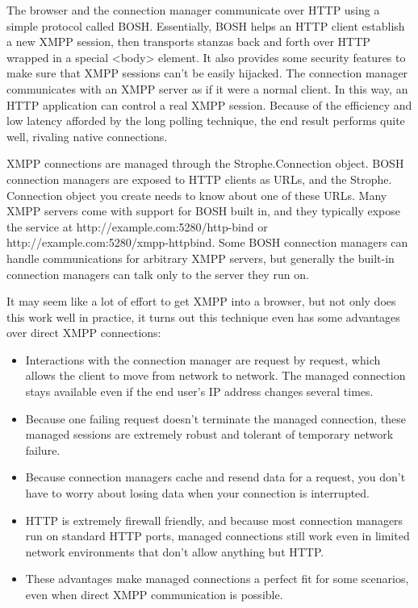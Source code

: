 	The browser and the connection manager communicate over HTTP using a simple protocol called BOSH. Essentially, BOSH helps an HTTP client establish a new XMPP session, then transports stanzas back and forth over HTTP wrapped in a special <body> element. It also provides some security features to make sure that XMPP sessions can’t be easily hijacked. The connection manager communicates with an XMPP server as if it were a normal client. In this way, an HTTP application can control a real XMPP session. Because of the efficiency and low latency afforded by the long polling technique, the end result performs quite well, rivaling native connections.

	XMPP connections are managed through the Strophe.Connection object. BOSH connection managers are exposed to HTTP clients as URLs, and the Strophe. Connection object you create needs to know about one of these URLs. Many XMPP servers come with support for BOSH built in, and they typically expose the service at http://example.com:5280/http-bind or http://example.com:5280/xmpp-httpbind. Some BOSH connection managers can handle communications for arbitrary XMPP servers, but generally the built-in connection managers can talk only to the server they run on.

	It may seem like a lot of effort to get XMPP into a browser, but not only does this work well in practice, it turns out this technique even has some advantages over direct XMPP connections:
	\begin{itemize}
	\item Interactions with the connection manager are request by request, which allows the client to move from network to network. The managed connection stays available even if the end user’s IP address changes several times.
	\item Because one failing request doesn’t terminate the managed connection, these managed sessions are extremely robust and tolerant of temporary network failure.
	\item Because connection managers cache and resend data for a request, you don’t have to worry about losing data when your connection is interrupted.
	\item HTTP is extremely firewall friendly, and because most connection managers run on standard HTTP ports, managed connections still work even in limited network environments that don’t allow anything but HTTP.
	\item These advantages make managed connections a perfect fit for some scenarios, even when direct XMPP communication is possible.
	\end{itemize}

